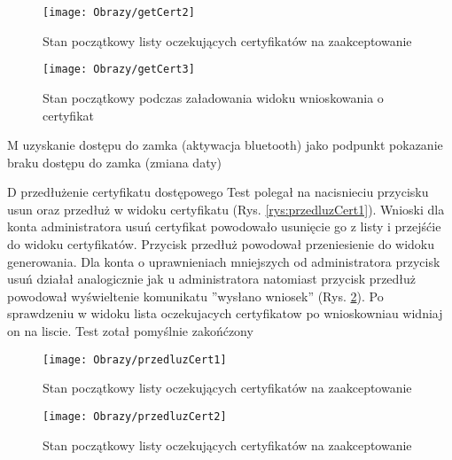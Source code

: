 \begin{enumerate*}
\begin{figure}[ht!]
		\begin{minipage}{0.2\textwidth}
			\texttt{[image: Obrazy/getCert2]}
			\caption{Stan początkowy listy oczekujących certyfikatów na zaakceptowanie }
			\label{rys:getCert2}
		\end{minipage}
		
		
		\begin{minipage}{0.2\textwidth}
			\texttt{[image: Obrazy/getCert3]}
			\caption{Stan początkowy podczas załadowania widoku wnioskowania o certyfikat}
			\label{rys:getCert3}
		\end{minipage}
		
	
	\end{figure}
	
	
	\item M uzyskanie dostępu do zamka (aktywacja bluetooth)
		 jako podpunkt pokazanie braku dostępu do zamka (zmiana daty)
	\item D przedłużenie certyfikatu dostępowego
	Test polegał na nacisnieciu przycisku usun oraz przedłuż w widoku certyfikatu (Rys. \ref{rys:przedluzCert1}).
	Wnioski dla konta administratora usuń certyfikat powodowało usunięcie go z listy i przejśćie do widoku certyfikatów. Przycisk przedłuż powodował przeniesienie do widoku generowania. Dla konta o uprawnieniach  mniejszych od administratora przycisk usuń działał analogicznie jak u administratora natomiast przycisk przedłuż powodował wyświeltenie komunikatu ''wysłano wniosek'' (Rys. \ref{rys:przedluzCert2}).
	Po sprawdzeniu w widoku lista oczekujacych certyfikatow po wnioskowniau widniaj on na liscie. Test zotał pomyślnie zakońćzony
	
	
		\begin{figure}[ht!]
		
		\begin{minipage}{0.2\textwidth}
			\texttt{[image: Obrazy/przedluzCert1]}
			\caption{Stan początkowy listy oczekujących certyfikatów na zaakceptowanie }
			\label{rys:przedluzCert1}
		\end{minipage}
		
		\begin{minipage}{0.2\textwidth}
			\texttt{[image: Obrazy/przedluzCert2]}
			\caption{Stan początkowy listy oczekujących certyfikatów na zaakceptowanie }
			\label{rys:przedluzCert2}
		\end{minipage}
		
		
	
		
	\end{figure}
	

\end{enumerate*}
